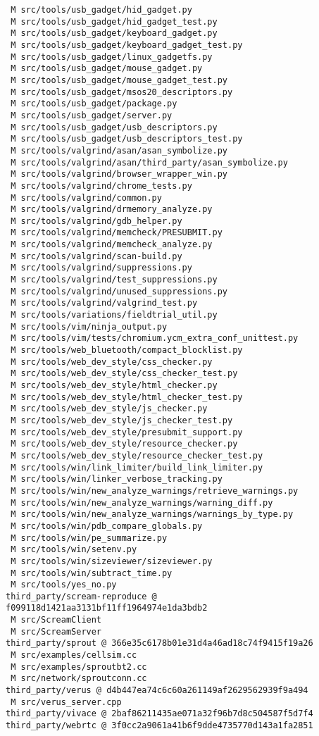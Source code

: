 \documentclass{article}
\begin{document}
\begin{verbatim}
 M src/tools/usb_gadget/hid_gadget.py
 M src/tools/usb_gadget/hid_gadget_test.py
 M src/tools/usb_gadget/keyboard_gadget.py
 M src/tools/usb_gadget/keyboard_gadget_test.py
 M src/tools/usb_gadget/linux_gadgetfs.py
 M src/tools/usb_gadget/mouse_gadget.py
 M src/tools/usb_gadget/mouse_gadget_test.py
 M src/tools/usb_gadget/msos20_descriptors.py
 M src/tools/usb_gadget/package.py
 M src/tools/usb_gadget/server.py
 M src/tools/usb_gadget/usb_descriptors.py
 M src/tools/usb_gadget/usb_descriptors_test.py
 M src/tools/valgrind/asan/asan_symbolize.py
 M src/tools/valgrind/asan/third_party/asan_symbolize.py
 M src/tools/valgrind/browser_wrapper_win.py
 M src/tools/valgrind/chrome_tests.py
 M src/tools/valgrind/common.py
 M src/tools/valgrind/drmemory_analyze.py
 M src/tools/valgrind/gdb_helper.py
 M src/tools/valgrind/memcheck/PRESUBMIT.py
 M src/tools/valgrind/memcheck_analyze.py
 M src/tools/valgrind/scan-build.py
 M src/tools/valgrind/suppressions.py
 M src/tools/valgrind/test_suppressions.py
 M src/tools/valgrind/unused_suppressions.py
 M src/tools/valgrind/valgrind_test.py
 M src/tools/variations/fieldtrial_util.py
 M src/tools/vim/ninja_output.py
 M src/tools/vim/tests/chromium.ycm_extra_conf_unittest.py
 M src/tools/web_bluetooth/compact_blocklist.py
 M src/tools/web_dev_style/css_checker.py
 M src/tools/web_dev_style/css_checker_test.py
 M src/tools/web_dev_style/html_checker.py
 M src/tools/web_dev_style/html_checker_test.py
 M src/tools/web_dev_style/js_checker.py
 M src/tools/web_dev_style/js_checker_test.py
 M src/tools/web_dev_style/presubmit_support.py
 M src/tools/web_dev_style/resource_checker.py
 M src/tools/web_dev_style/resource_checker_test.py
 M src/tools/win/link_limiter/build_link_limiter.py
 M src/tools/win/linker_verbose_tracking.py
 M src/tools/win/new_analyze_warnings/retrieve_warnings.py
 M src/tools/win/new_analyze_warnings/warning_diff.py
 M src/tools/win/new_analyze_warnings/warnings_by_type.py
 M src/tools/win/pdb_compare_globals.py
 M src/tools/win/pe_summarize.py
 M src/tools/win/setenv.py
 M src/tools/win/sizeviewer/sizeviewer.py
 M src/tools/win/subtract_time.py
 M src/tools/yes_no.py
third_party/scream-reproduce @ f099118d1421aa3131bf11ff1964974e1da3bdb2
 M src/ScreamClient
 M src/ScreamServer
third_party/sprout @ 366e35c6178b01e31d4a46ad18c74f9415f19a26
 M src/examples/cellsim.cc
 M src/examples/sproutbt2.cc
 M src/network/sproutconn.cc
third_party/verus @ d4b447ea74c6c60a261149af2629562939f9a494
 M src/verus_server.cpp
third_party/vivace @ 2baf86211435ae071a32f96b7d8c504587f5d7f4
third_party/webrtc @ 3f0cc2a9061a41b6f9dde4735770d143a1fa2851
\end{verbatim}
\end{document}
